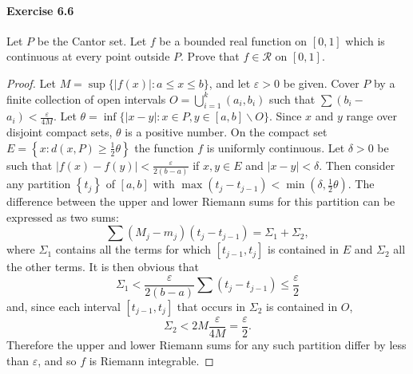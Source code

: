 \documentclass{article}
\theoremstyle{definition}
\begin{document}
\paragraph{Exercise 6.6} Let $P$ be the Cantor set. Let $f$ be a bounded real function on $[0,1]$ which is continuous at every point outside $P$. Prove that $f \in \mathcal{R}$ on $[0,1]$.
\begin{proof}
    Let $M=\sup \{|f(x)|: a \leq x \leq b\}$, and let $\varepsilon>0$ be given. Cover $P$ by a finite collection of open intervals $O=\bigcup_{i=1}^k\left(a_i, b_i\right)$ such that $\sum\left(b_i-\right.$ $\left.a_i\right)<\frac{\varepsilon}{4 M}$. Let $\theta=\inf \{|x-y|: x \in P, y \in[a, b] \backslash O\}$. Since $x$ and $y$ range over disjoint compact sets, $\theta$ is a positive number. On the compact set $E=\left\{x: d(x, P) \geq \frac{1}{2} \theta\right\}$ the function $f$ is uniformly continuous. Let $\delta>0$ be such that $|f(x)-f(y)|<\frac{\varepsilon}{2(b-a)}$ if $x, y \in E$ and $|x-y|<\delta$. Then consider any partition $\left\{t_j\right\}$ of $[a, b]$ with $\max \left(t_j-t_{j-1}\right)<\min \left(\delta, \frac{1}{2} \theta\right)$. The difference between the upper and lower Riemann sums for this partition can be expressed as two sums:
$$
\sum\left(M_j-m_j\right)\left(t_j-t_{j-1}\right)=\Sigma_1+\Sigma_2,
$$
where $\Sigma_1$ contains all the terms for which $\left[t_{j-1}, t_j\right]$ is contained in $E$ and $\Sigma_2$ all the other terms. It is then obvious that
$$
\Sigma_1<\frac{\varepsilon}{2(b-a)} \sum\left(t_j-t_{j-1}\right) \leq \frac{\varepsilon}{2}
$$
and, since each interval $\left[t_{j-1}, t_j\right]$ that occurs in $\Sigma_2$ is contained in $O$,
$$
\Sigma_2<2 M \frac{\varepsilon}{4 M}=\frac{\varepsilon}{2} .
$$
Therefore the upper and lower Riemann sums for any such partition differ by less than $\varepsilon$, and so $f$ is Riemann integrable.
\end{proof}
\end{document}
